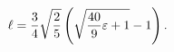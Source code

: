 \begin{equation}
\ell=\frac{3}{4} \sqrt{2\over5}\left(\sqrt{\frac{40}{9}
\varepsilon +1} - 1 \right).
\end{equation}

